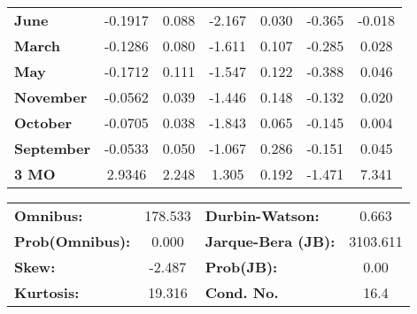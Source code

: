 \begin{center}
\begin{tabular}{lcccccc}
\textbf{June}      &      -0.1917  &        0.088     &    -2.167  &         0.030        &       -0.365    &       -0.018     \\
\textbf{March}     &      -0.1286  &        0.080     &    -1.611  &         0.107        &       -0.285    &        0.028     \\
\textbf{May}       &      -0.1712  &        0.111     &    -1.547  &         0.122        &       -0.388    &        0.046     \\
\textbf{November}  &      -0.0562  &        0.039     &    -1.446  &         0.148        &       -0.132    &        0.020     \\
\textbf{October}   &      -0.0705  &        0.038     &    -1.843  &         0.065        &       -0.145    &        0.004     \\
\textbf{September} &      -0.0533  &        0.050     &    -1.067  &         0.286        &       -0.151    &        0.045     \\
\textbf{3 MO}      &       2.9346  &        2.248     &     1.305  &         0.192        &       -1.471    &        7.341     \\
\bottomrule
\end{tabular}
\begin{tabular}{lclc}
\textbf{Omnibus:}       & 178.533 & \textbf{  Durbin-Watson:     } &    0.663  \\
\textbf{Prob(Omnibus):} &   0.000 & \textbf{  Jarque-Bera (JB):  } & 3103.611  \\
\textbf{Skew:}          &  -2.487 & \textbf{  Prob(JB):          } &     0.00  \\
\textbf{Kurtosis:}      &  19.316 & \textbf{  Cond. No.          } &     16.4  \\
\bottomrule
\end{tabular}
\end{center}

